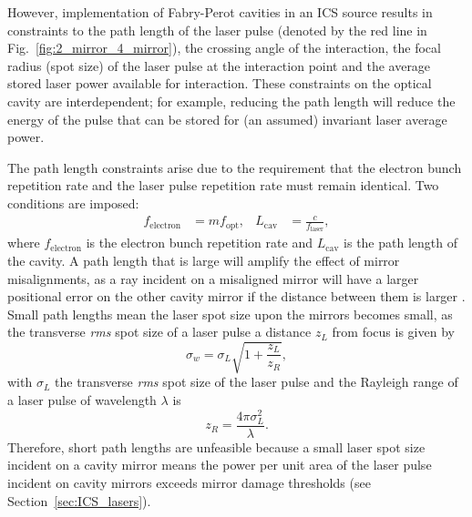 \documentclass[../main.tex]{subfiles}
\begin{document}
However, implementation of Fabry-Perot cavities in an ICS source results in constraints to the path length of the laser pulse (denoted by the red line in Fig.~\ref{fig:2_mirror_4_mirror}), the crossing angle of the interaction, the focal radius (spot size) of the laser pulse at the interaction point and the average stored laser power available for interaction. These constraints on the optical cavity are interdependent; for example, reducing the path length will reduce the energy of the pulse that can be stored for (an assumed) invariant laser average power.

The path length constraints arise due to the requirement that the electron bunch repetition rate and the laser pulse repetition rate must remain identical. Two conditions are imposed:
\begin{align}
f_{\mathrm{electron}} &= mf_{\mathrm{opt}}, & L_{\mathrm{cav}} &= \frac{c}{f_{\mathrm{laser}}},
\label{eq:optical_path_length_conditions}    
\end{align}
where $f_{\mathrm{electron}}$ is the electron bunch repetition rate and $L_{\mathrm{cav}}$ is the path length of the cavity. A path length that is large will amplify the effect of mirror misalignments, as a ray incident on a misaligned mirror will have a larger positional error on the other cavity mirror if the distance between them is larger \cite{zomer2009polarization}. Small path lengths mean the laser spot size upon the mirrors becomes small, as the transverse \textit{rms} spot size of a laser pulse a distance $z_{L}$ from focus is given by \cite{siegmann1986lasers}
\begin{equation}
\sigma_{w} = \sigma_{L}\sqrt{1+\frac{z_{L}}{z_{R}}},
\label{eq:laser_waist}    
\end{equation}
with $\sigma_{L}$ the transverse \textit{rms} spot size of the laser pulse and the Rayleigh range \cite{siegmann1986lasers} of a laser pulse of wavelength $\lambda$ is
\begin{equation}
z_{R} = \frac{4\pi\sigma_{L}^{2}}{\lambda}.
\label{eq:rayleigh_range}    
\end{equation}
Therefore, short path lengths are unfeasible because a small laser spot size incident on a cavity mirror means the power per unit area of the laser pulse incident on cavity mirrors exceeds mirror damage thresholds (see Section~\ref{sec:ICS_lasers}).
\end{document}
